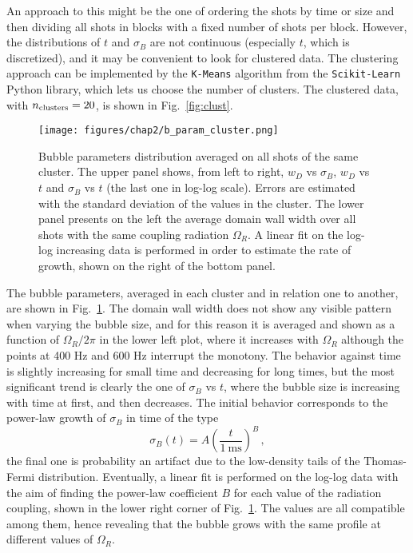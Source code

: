 An approach to this might be the one of ordering the shots by time or size and then dividing all shots in blocks with a fixed number of shots per block. However, the distributions of $t$ and $\sigma_B$ are not continuous (especially $t$, which is discretized), and it may be convenient to look for clustered data. 
The clustering approach can be implemented by the \texttt{K-Means} algorithm from the \texttt{Scikit-Learn} Python library, which lets us choose the number of clusters. The clustered data, with $n_{\rm clusters} = 20$, is shown in Fig.\ \ref{fig:clust}. 
\begin{figure}[ht!]
    \centering
    \texttt{[image: figures/chap2/b\_param\_cluster.png]}
    \caption{Bubble parameters distribution averaged on all shots of the same cluster. The upper panel shows, from left to right, $w_D$ vs $\sigma_B$, $w_D$ vs $t$ and $\sigma_B$ vs $t$ (the last one in log-log scale). Errors are estimated with the standard deviation of the values in the cluster. The lower panel presents on the left the average domain wall width over all shots with the same coupling radiation $\Omega_R$. A linear fit on the log-log increasing data is performed in order to estimate the rate of growth, shown on the right of the bottom panel.}
    \label{fig:b_param}
\end{figure}

The bubble parameters, averaged in each cluster and in relation one to another, are shown in Fig.\ \ref{fig:b_param}. The domain wall width does not show any visible pattern when varying the bubble size, and for this reason it is averaged and shown as a function of $\Omega_R/2\pi$ in the lower left plot, where it increases with $\Omega_R$ although the points at 400 Hz and 600 Hz interrupt the monotony. The behavior against time is slightly increasing for small time and decreasing for long times, but the most significant trend is clearly the one of $\sigma_B$ vs $t$, where the bubble size is increasing with time at first, and then decreases. The initial behavior corresponds to the power-law growth of $\sigma_B$ in time of the type
\[
    \sigma_B(t) = A\left(\frac{t}{1\ \unit{\milli\second}}\right)^B\, , 
\]
the final one is probability an artifact due to the low-density tails of the Thomas-Fermi distribution. Eventually, a linear fit is performed on the log-log data with the aim of finding the power-law coefficient $B$ for each value of the radiation coupling, shown in the lower right corner of Fig.\ \ref{fig:b_param}. The values are all compatible among them, hence revealing that the bubble grows with the same profile at different values of $\Omega_R$.

